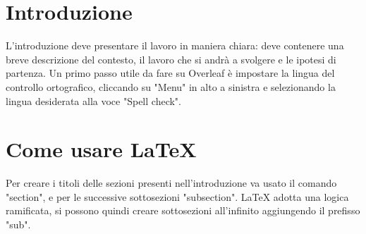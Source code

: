 \documentclass{00-settings/document}
\begin{document}
\maketitle
\begin{abstract}
Questo file vi aiuterà nella redazione della tesina di Analisi dei sistemi e nell'utilizzo di LaTeX.
Word si basa sul paradigma WYSIWYG (What You See Is What You Get, ciò che vedi è quello che ottieni), al contrario con LaTeX si compila un testo preoccupandosi essenzialmente del contenuto e non della forma.
Questo file in particolare contiene tutte le impostazioni grafiche necessarie, dovrete quindi preoccuparvi di aggiungere solamente il contenuto. Ad esempio, per generare questo sommario basta scrivere all'interno dei comandi "begin abstract" e "end abstract", il foglio di stile applicherà le impostazioni di formattazione automaticamente  
La tesina si organizza in sezioni, sottosezioni e paragrafi. Deve quindi contenere un sommario, un indice, un’introduzione, una sezione dedicata alla costruzione del modello, una sezione dedicata alle simulazioni, le conclusioni e la bibliografia.
In questa prima sezione (sommario) si descrive sinteticamente lo scopo dell'esperienza, cosa è stato fatto e i risultati ottenuti (10/15 righe). Tipicamente questa sezione non contiene abbreviazioni o risultati numerici.
\end{abstract}
\newpage
\tableofcontents
\newpage
\section{Introduzione}
L'introduzione deve presentare il lavoro in maniera chiara: deve contenere una breve descrizione del contesto, il lavoro che si andrà a svolgere e le ipotesi di partenza. Un primo passo utile da fare su Overleaf è impostare la lingua del controllo ortografico, cliccando su "Menu" in alto a sinistra e selezionando la lingua desiderata alla voce "Spell check".

\section{Come usare LaTeX}
Per creare i titoli delle sezioni presenti nell'introduzione va usato il comando "section", e per le successive sottosezioni "subsection". LaTeX adotta una logica ramificata, si possono quindi creare sottosezioni all'infinito aggiungendo il prefisso "sub".
\end{document}
